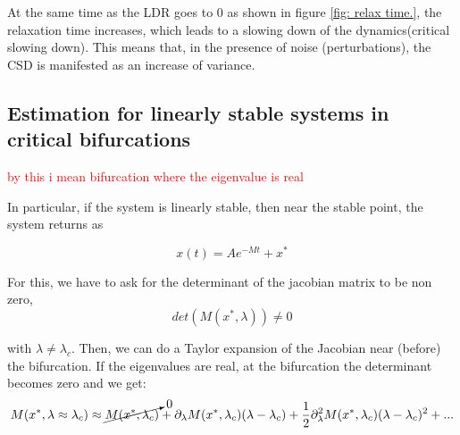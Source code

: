 At the same time as the LDR goes to $0$ as shown in figure \ref{fig: relax time.}, the relaxation time increases, which leads to a slowing down of the dynamics(critical slowing down). 
This means that, in the presence of noise (perturbations), the CSD is manifested as an increase of variance.  






\subsection{Estimation for linearly stable systems in critical bifurcations}
\textcolor{red}{by this i mean bifurcation where the eigenvalue is real}

In particular, if the system is linearly stable, then near the stable point, the system returns as

\begin{equation}
	x(t)=Ae^{-M t}+x^*
\end{equation}

For this, we have to ask for the determinant of the jacobian matrix to be non zero, 
\begin{equation}
	det(M(x^*,\lambda))\neq0
\end{equation}

with $\lambda\neq \lambda_c$. Then, we can do a Taylor expansion of the Jacobian near (before) the bifurcation. 
If the eigenvalues are real,  at the bifurcation the determinant becomes zero and we get:
\begin{equation}
	M(x^*,\lambda\approx \lambda_c)\approx \cancelto{0}{M(x^*,\lambda_c)}+\partial_\lambda M(x^*,\lambda_c) (\lambda-\lambda_c)+\frac{1}{2}\partial^2_\lambda M(x^*,\lambda_c) (\lambda-\lambda_c)^2+... 
\end{equation}

